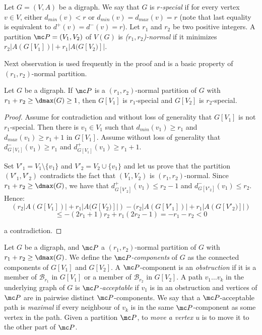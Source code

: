 Let $G = (V,A)$ be a digraph. 
We say that $G$ is \emph{$r$-special} if for every vertex $v \in V$, either $d_{min}(v) < r$ or $d_{min}(v) = d_{max}(v) = r$ (note that last equality is equivalent to $d^+(v)= d^-(v) = r$). 
Let $r_1$ and $r_2$ be two positive integers. A partition $\mc P = (V_{1}, V_{2})$ of $V(G)$ is \emph{($r_1, r_2$)-normal} if it minimizes $r_{2}|A(G[V_1])| + r_{1}|A(G[V_2)]|$. 


Next observation is used frequently in the proof and is a basic property of $(r_1,r_2)$-normal partition. 
\begin{observation}\label{obs:special}
Let $G$ be a digraph. If $\mc P$ is a $(r_1, r_2)$-normal partition of $G$ with $r_1 + r_2 \geq \dmax(G) \geq 1$, then $G[V_{1}]$ is $r_{1}$-special and $G[V_{2}]$ is $r_{2}$-special. 
\end{observation}

\begin{proof}
Assume for contradiction and without loss of generality that $G[V_1]$ is not $r_1$-special. Then there is $v_1 \in V_1$ such that $d_{min}(v_1) \geq r_1$ and $d_{max}(v_1) \geq r_1 + 1$ in $G[V_1]$. Assume without loss of generality that $d^-_{G[V_1]}(v_1) \geq r_1$ and $d^+_{G[V_1]}(v_1) \geq r_1 + 1$. 

Set $V'_1 = V_1 \setminus \{v_1\}$ and $V'_2 = V_2 \cup \{v_1\}$ and let us prove that the partition $(V'_1, V'_2)$ contradicts the fact that $(V_1, V_2)$ is $(r_1, r_2)$-normal. 
Since $r_1 + r_2 \geq \dmax(G)$, we have that $d^+_{G[V'_2]}(v_1) \leq r_2 - 1$ and $d^-_{G[V'_2]}(v_1) \leq r_2$. Hence:
$$(r_{2}|A(G[V_1])| + r_{1}|A(G[V_2)]|) - (r_{2}|A(G[V'_1])| + r_{1}|A(G[V'_2)]|)$$
$$ \leq -(2r_1+1)r_2 +r_1(2r_2-1) = -r_1-r_2<0$$

a contradiction. 

\end{proof}

Let $G$ be a digraph, and  $\mc P$  a $(r_1,r_2)$-normal partition of $G$ with $r_1 + r_2 \geq \dmax(G)$. 
We define the \emph{$\mc P$-components} of $G$ as the connected components of $G[V_{1}]$ and $G[V_{2}]$. 
A $\mc P$-component is an \emph{obstruction} if it is a member of $\mathcal B_{r_{1}}$ in $G[V_{1}]$ or a member of $\mathcal B_{r_{2}}$ in $G[V_{2}]$. %
A path $v_1 \dots v_k$  in the underlying graph of $G$ is \emph{$\mc P$-acceptable} if $v_{1}$ is in an obstruction and  vertices of $\mc P$ are in pairwise distinct $\mc P$-components.
We say that a  $\mc P$-acceptable path is \emph{maximal} if every neighbour of $v_{k}$ is in the same $\mc P$-component as some vertex in the path. %
Given a partition $\mc P$, to \emph{move a vertex $u$} is to move it to the other part of $\mc P$. 


